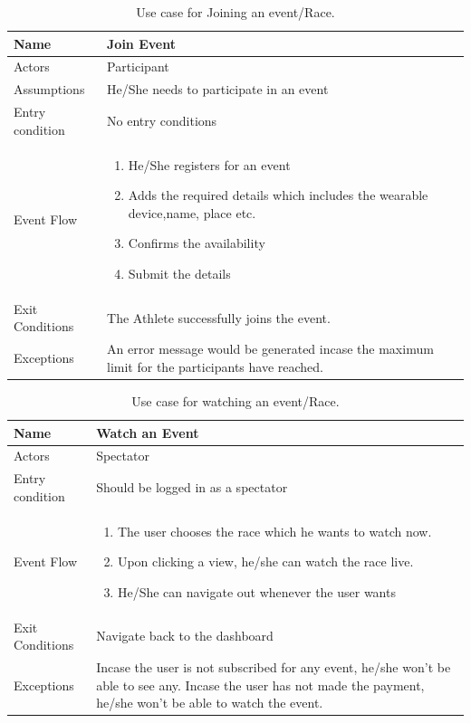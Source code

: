 \begin{table}[H]
\begin{tabular}{| l | p{} |}
\hline
Name & Join Event\\
\hline
Actors & Participant\\
\hline
Assumptions & He/She needs to participate in an event\\
\hline
Entry condition & No entry conditions\\
\hline
Event Flow & \begin{enumerate}
\item He/She registers for an event 
\item Adds the required details which includes the wearable device,name, place etc.
\item Confirms the availability 
\item Submit the details
\end{enumerate}
\\
\hline
Exit Conditions & The Athlete successfully joins the event. \\
\hline
Exceptions & An error message would be generated incase the maximum limit for the participants have reached.\\
\hline
\end{tabular}
\caption{Use case for Joining an event/Race.}
\label{usecase-join-event/race}
\end{table}


\begin{table}[H]
\begin{tabular}{| l | p{} |}
\hline
Name & Watch an Event\\
\hline
Actors & Spectator\\
\hline
Entry condition & Should be logged in as a spectator\\
\hline
Event Flow & \begin{enumerate}
\item The user chooses the race which he wants to watch now.
\item Upon clicking a view, he/she can watch the race live.
\item He/She can navigate out whenever the user wants
\end{enumerate}
\\
\hline
Exit Conditions & Navigate back to the dashboard \\
\hline
Exceptions & Incase the user is not subscribed for any event, he/she won’t be able to see any. Incase the user has not made the payment, he/she won’t be able to watch the event. \\
\hline
\end{tabular}
\caption{Use case for watching an event/Race.}
\label{usecase-watch-event/race}
\end{table}


